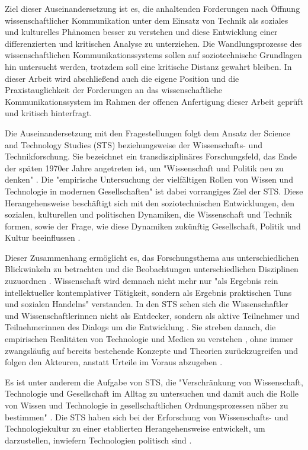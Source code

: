 Ziel dieser Auseinandersetzung ist es, die anhaltenden Forderungen nach Öffnung wissenschaftlicher Kommunikation unter dem Einsatz von Technik als soziales und kulturelles Phänomen besser zu verstehen und diese Entwicklung einer differenzierten und kritischen Analyse zu unterziehen. Die Wandlungsprozesse des wissenschaftlichen Kommunikationssystems sollen auf soziotechnische Grundlagen hin untersucht werden, trotzdem soll eine kritische Distanz gewahrt bleiben. In dieser Arbeit wird abschließend auch die eigene Position und die Praxistauglichkeit der Forderungen an das wissenschaftliche Kommunikationssystem im Rahmen der offenen Anfertigung dieser Arbeit geprüft und kritisch hinterfragt.

Die Auseinandersetzung mit den Fragestellungen folgt dem Ansatz der Science and Technology Studies (STS) beziehungsweise der Wissenschafts- und Technikforschung. Sie bezeichnet ein transdisziplinäres Forschungsfeld, das Ende der späten 1970er Jahre angetreten ist, um "Wissenschaft und Politik neu zu denken" \cite[:92]{Potthast_2010}. Die "empirische Untersuchung der vielfältigen Rollen von Wissen und Technologie in modernen Gesellschaften" \cite[:11]{Beck_2014} ist dabei vorrangiges Ziel der STS. Diese Herangehensweise beschäftigt sich mit den soziotechnischen Entwicklungen, den sozialen, kulturellen und politischen Dynamiken, die Wissenschaft und Technik formen, sowie der Frage, wie diese Dynamiken zukünftig Gesellschaft, Politik und Kultur beeinflussen \cite{Potthast_2010} \cite{Brown_2014}.

Dieser Zusammenhang ermöglicht es, das Forschungsthema aus unterschiedlichen Blickwinkeln zu betrachten und die Beobachtungen unterschiedlichen Disziplinen zuzuordnen \cite{Beck_2014} \cite{Potthast_2010}. Wissenschaft wird demnach nicht mehr nur "als Ergebnis rein intellektueller kontemplativer Tätigkeit, sondern als Ergebnis praktischen Tuns und sozialen Handelns" \cite[:13]{Beck_2014} verstanden. In den STS sehen sich die Wissenschaftler und Wissenschaftlerinnen nicht als Entdecker, sondern als aktive Teilnehmer und Teilnehmerinnen des Dialogs um die Entwicklung \cite{MacKenzie_1999}. Sie streben danach, die empirischen Realitäten von Technologie und Medien zu verstehen \cite{Kelty_2014}, ohne immer zwangsläufig auf bereits bestehende Konzepte und Theorien zurückzugreifen \cite[:8]{Brown_2014} und folgen den Akteuren, anstatt Urteile im Voraus abzugeben \cite[:584]{Irwin_2008}.

Es ist unter anderem die Aufgabe von STS, die "Verschränkung von Wissenschaft, Technologie und Gesellschaft im Alltag zu untersuchen und damit auch die Rolle von Wissen und Technologie in gesellschaftlichen Ordnungsprozessen näher zu bestimmen" \cite[:9]{Beck_2014}. Die STS haben sich bei der Erforschung von Wissenschafts- und Technologiekultur zu einer etablierten Herangehensweise entwickelt, um darzustellen, inwiefern Technologien politisch sind \cite{Kelty_2014}.

